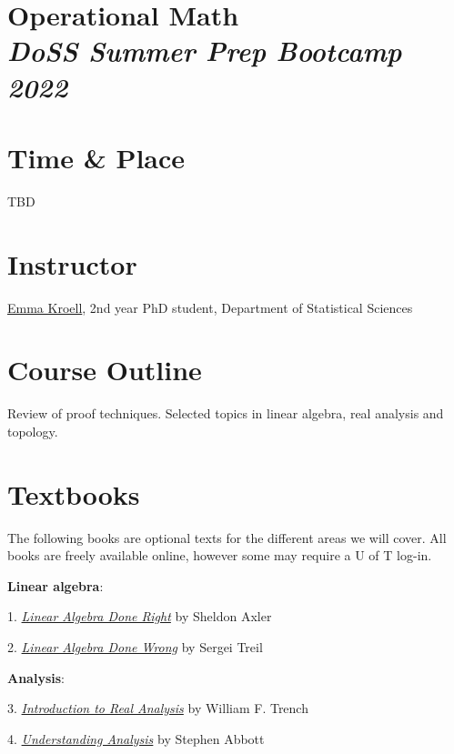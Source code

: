 \documentclass[12pt]{article}
\date{ }
\begin{document}
\section*{Operational Math\\  {\it{DoSS Summer Prep Bootcamp 2022}}}

\section{Time \& Place}
TBD

\section{Instructor}
\href{https://www.statistics.utoronto.ca/people/directories/graduate-students/emma-kroell}{Emma Kroell}, 2nd year PhD student, Department of Statistical Sciences


\section{Course Outline}
Review of proof techniques. Selected topics in linear algebra, real analysis and topology.

\section{Textbooks}
The following books are optional texts for the different areas we will cover. All books are freely available online, however some may require a U of T log-in.


\noindent
{\bf{Linear algebra}}:

\vspace{0.1cm}

1. \href{https://link-springer-com.myaccess.library.utoronto.ca/book/10.1007/978-3-319-11080-6}{{\emph{Linear Algebra Done Right}}} by Sheldon Axler

2. \href{https://www.math.brown.edu/streil/papers/LADW/LADW.html}{{\emph{Linear Algebra Done Wrong}}} by Sergei Treil

\noindent
{\bf{Analysis}}:
\vspace{0.1cm}

3. \href{https://digitalcommons.trinity.edu/mono/7/}{{\emph{Introduction to Real Analysis}}} by William F. Trench

4. \href{https://link-springer-com.myaccess.library.utoronto.ca/book/10.1007/978-1-4939-2712-8}{{\emph{Understanding Analysis}}} by Stephen Abbott
\end{document}
